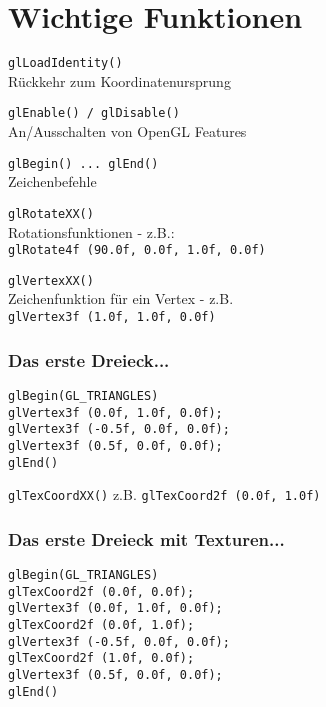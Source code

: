 \documentclass{beamer}
\begin{document}
\section{Wichtige Funktionen}
\frame
{
	\large{\texttt{glLoadIdentity()}}
	\\
	R\"uckkehr zum Koordinatenursprung
}

\frame
{
	\large{\texttt{glEnable() / glDisable()}}
	\\
	An/Ausschalten von OpenGL Features
}

\frame
{
	\large{\texttt{glBegin() ... glEnd()}}
	\\
	Zeichenbefehle
}

\frame
{
	\large{\texttt{glRotateXX()}}
	\\
	Rotationsfunktionen - z.B.:\\
	\texttt{glRotate4f (90.0f, 0.0f, 1.0f, 0.0f)}
}

\frame
{
	\large{\texttt{glVertexXX()}}
	\\
	Zeichenfunktion f\"ur ein Vertex - z.B.\\
	\texttt{glVertex3f (1.0f, 1.0f, 0.0f)}
}

\frame
{
	\frametitle{Das erste Dreieck...}
	\texttt{glBegin(GL\_TRIANGLES)\\  glVertex3f (0.0f, 1.0f, 0.0f);\\  glVertex3f (-0.5f, 0.0f, 0.0f);\\  glVertex3f (0.5f, 0.0f, 0.0f);\\glEnd()}
}

\frame
{
	\large{\texttt{glTexCoordXX()}}
	z.B. \texttt{glTexCoord2f (0.0f, 1.0f)}
}

\frame
{
	\frametitle{Das erste Dreieck mit Texturen...}
	\texttt{glBegin(GL\_TRIANGLES)\\  glTexCoord2f (0.0f, 0.0f);\\  glVertex3f (0.0f, 1.0f, 0.0f);\\  glTexCoord2f (0.0f, 1.0f);\\  glVertex3f (-0.5f, 0.0f, 0.0f);\\  glTexCoord2f (1.0f, 0.0f);\\  glVertex3f (0.5f, 0.0f, 0.0f);\\glEnd()}
}
\end{document}
